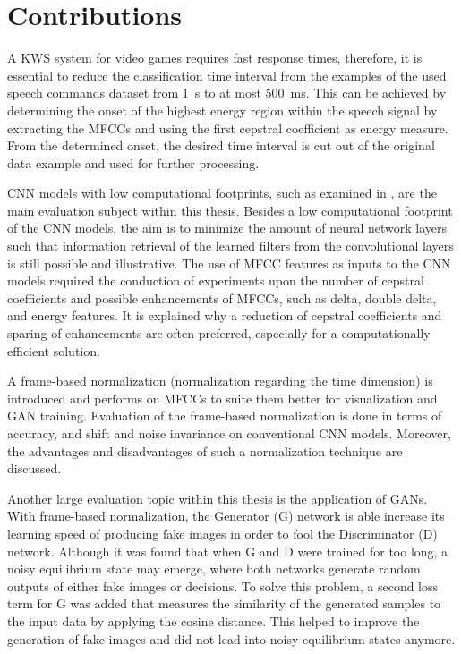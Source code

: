 
\section{Contributions}
A KWS system for video games requires fast response times, therefore, it is essential to reduce the classification time interval from the examples of the used speech commands dataset \cite{Warden2018} from \SI{1}{\second} to at most \SI{500}{\milli\second}.
This can be achieved by determining the onset of the highest energy region within the speech signal by extracting the MFCCs and using the first cepstral coefficient as energy measure.
From the determined onset, the desired time interval is cut out of the original data example and used for further processing.

CNN models with low computational footprints, such as examined in \cite{Sainath2015}, are the main evaluation subject within this thesis.
Besides a low computational footprint of the CNN models, the aim is to minimize the amount of neural network layers such that information retrieval of the learned filters from the convolutional layers is still possible and illustrative.
The use of MFCC features as inputs to the CNN models required the conduction of experiments upon the number of cepstral coefficients and possible enhancements of MFCCs, such as delta, double delta, and energy features.
It is explained why a reduction of cepstral coefficients and sparing of enhancements are often preferred, especially for a computationally efficient solution.

A frame-based normalization (normalization regarding the time dimension) is introduced and performs on MFCCs to suite them better for visualization and GAN training.
Evaluation of the frame-based normalization is done in terms of accuracy, and shift and noise invariance on conventional CNN models.
Moreover, the advantages and disadvantages of such a normalization technique are discussed.

Another large evaluation topic within this thesis is the application of GANs. 
With frame-based normalization, the Generator (G) network is able increase its learning speed of producing fake images in order to fool the Discriminator (D) network.
Although it was found that when G and D were trained for too long, a noisy equilibrium state may emerge, where both networks generate random outputs of either fake images or decisions.
To solve this problem, a second loss term for G was added that measures the similarity of the generated samples to the input data by applying the cosine distance.
This helped to improve the generation of fake images and did not lead into noisy equilibrium states anymore.


